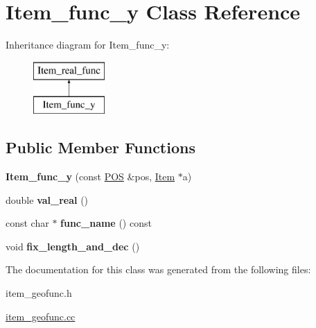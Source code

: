 \hypertarget{classItem__func__y}{}\section{Item\+\_\+func\+\_\+y Class Reference}
\label{classItem__func__y}
Inheritance diagram for Item\+\_\+func\+\_\+y\+:\begin{figure}[H]
\begin{center}
\leavevmode
\includegraphics[height=2.000000cm]{classItem__func__y}
\end{center}
\end{figure}
\subsection*{Public Member Functions}
\begin{DoxyCompactItemize}
\item 
\mbox{\label{classItem__func__y_af015126a1b1b25bc3975569e7cea6b2c}} 
{\bfseries Item\+\_\+func\+\_\+y} (const \mbox{\hyperlink{structYYLTYPE}{P\+OS}} \&pos, \mbox{\hyperlink{classItem}{Item}} $\ast$a)
\item 
\mbox{\label{classItem__func__y_a0849aa009ed29bb619b07ae787aff26b}} 
double {\bfseries val\+\_\+real} ()
\item 
\mbox{\label{classItem__func__y_aa1f93e4b3955638fa14cc325c8ada97f}} 
const char $\ast$ {\bfseries func\+\_\+name} () const
\item 
\mbox{\label{classItem__func__y_ac252317968324e6a9dca950d33861998}} 
void {\bfseries fix\+\_\+length\+\_\+and\+\_\+dec} ()
\end{DoxyCompactItemize}


The documentation for this class was generated from the following files\+:\begin{DoxyCompactItemize}
\item 
item\+\_\+geofunc.\+h\item 
\mbox{\hyperlink{item__geofunc_8cc}{item\+\_\+geofunc.\+cc}}\end{DoxyCompactItemize}
